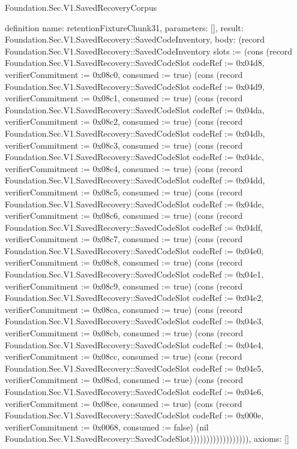 \begin{lexlean}{Foundation.Sec.V1.SavedRecoveryCorpus}
\begin{semanticmodule}
definition{
  name: retentionFixtureChunk31,
  parameters: [],
  result: Foundation.Sec.V1.SavedRecovery::SavedCodeInventory,
  body: (record Foundation.Sec.V1.SavedRecovery::SavedCodeInventory {slots := (cons (record Foundation.Sec.V1.SavedRecovery::SavedCodeSlot {codeRef := 0x04d8, verifierCommitment := 0x08c0, consumed := true}) (cons (record Foundation.Sec.V1.SavedRecovery::SavedCodeSlot {codeRef := 0x04d9, verifierCommitment := 0x08c1, consumed := true}) (cons (record Foundation.Sec.V1.SavedRecovery::SavedCodeSlot {codeRef := 0x04da, verifierCommitment := 0x08c2, consumed := true}) (cons (record Foundation.Sec.V1.SavedRecovery::SavedCodeSlot {codeRef := 0x04db, verifierCommitment := 0x08c3, consumed := true}) (cons (record Foundation.Sec.V1.SavedRecovery::SavedCodeSlot {codeRef := 0x04dc, verifierCommitment := 0x08c4, consumed := true}) (cons (record Foundation.Sec.V1.SavedRecovery::SavedCodeSlot {codeRef := 0x04dd, verifierCommitment := 0x08c5, consumed := true}) (cons (record Foundation.Sec.V1.SavedRecovery::SavedCodeSlot {codeRef := 0x04de, verifierCommitment := 0x08c6, consumed := true}) (cons (record Foundation.Sec.V1.SavedRecovery::SavedCodeSlot {codeRef := 0x04df, verifierCommitment := 0x08c7, consumed := true}) (cons (record Foundation.Sec.V1.SavedRecovery::SavedCodeSlot {codeRef := 0x04e0, verifierCommitment := 0x08c8, consumed := true}) (cons (record Foundation.Sec.V1.SavedRecovery::SavedCodeSlot {codeRef := 0x04e1, verifierCommitment := 0x08c9, consumed := true}) (cons (record Foundation.Sec.V1.SavedRecovery::SavedCodeSlot {codeRef := 0x04e2, verifierCommitment := 0x08ca, consumed := true}) (cons (record Foundation.Sec.V1.SavedRecovery::SavedCodeSlot {codeRef := 0x04e3, verifierCommitment := 0x08cb, consumed := true}) (cons (record Foundation.Sec.V1.SavedRecovery::SavedCodeSlot {codeRef := 0x04e4, verifierCommitment := 0x08cc, consumed := true}) (cons (record Foundation.Sec.V1.SavedRecovery::SavedCodeSlot {codeRef := 0x04e5, verifierCommitment := 0x08cd, consumed := true}) (cons (record Foundation.Sec.V1.SavedRecovery::SavedCodeSlot {codeRef := 0x04e6, verifierCommitment := 0x08ce, consumed := true}) (cons (record Foundation.Sec.V1.SavedRecovery::SavedCodeSlot {codeRef := 0x000e, verifierCommitment := 0x0068, consumed := false}) (nil Foundation.Sec.V1.SavedRecovery::SavedCodeSlot)))))))))))))))))}),
  axioms: []
}


\end{semanticmodule}
\end{lexlean}

